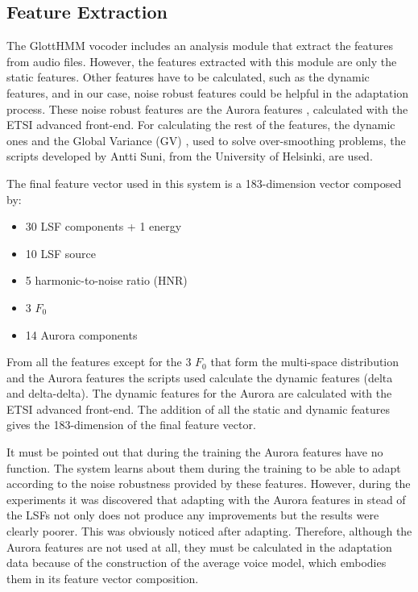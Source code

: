 \subsection{Feature Extraction}
\label{experiments_feature_extraction}
The GlottHMM vocoder includes an analysis module that extract the features from audio files.
%
However, the features extracted with this module are only the static features. 
%
Other features have to be calculated, such as the dynamic features, and in our case, noise robust features could be helpful in the adaptation process.
%
These noise robust features are the Aurora features \cite{etsi202}, calculated with the ETSI advanced front-end.
%
For calculating the rest of the features, the dynamic ones and the Global Variance (GV) \cite{toda2005speech}, used to solve over-smoothing problems, the scripts developed by Antti Suni, from the University of Helsinki, are used.

The final feature vector used in this system is a 183-dimension vector composed by:

\begin{itemize}
	\item 30 LSF components + 1 energy
	\item 10 LSF source
	\item 5 harmonic-to-noise ratio (HNR)
	\item 3  $F_{0}$
	\item 14 Aurora components
\end{itemize}

From all the features except for the 3 $F_{0}$ that form the multi-space distribution and the Aurora features the scripts used calculate the dynamic features (delta and delta-delta). 
%
The dynamic features for the Aurora are calculated with the ETSI advanced front-end.
%
The addition of all the static and dynamic features gives the 183-dimension of the final feature vector.

It must be pointed out that during the training the Aurora features have no function.
%
The system learns about them during the training to be able to adapt according to the noise robustness provided by these features.
%
However, during the experiments it was discovered that adapting with the Aurora features in stead of the LSFs not only does not produce any improvements but the results were clearly poorer.
%
This was obviously noticed after adapting. 
%
Therefore, although the Aurora features are not used at all, they must be calculated in the adaptation data because of the construction of the average voice model, which embodies them in its feature vector composition.

